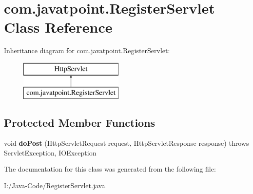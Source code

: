 \hypertarget{classcom_1_1javatpoint_1_1_register_servlet}{}\section{com.\+javatpoint.\+Register\+Servlet Class Reference}
\label{classcom_1_1javatpoint_1_1_register_servlet}
Inheritance diagram for com.\+javatpoint.\+Register\+Servlet\+:\begin{figure}[H]
\begin{center}
\leavevmode
\includegraphics[height=2.000000cm]{classcom_1_1javatpoint_1_1_register_servlet}
\end{center}
\end{figure}
\subsection*{Protected Member Functions}
\begin{DoxyCompactItemize}
\item 
\mbox{\label{classcom_1_1javatpoint_1_1_register_servlet_a4e8906784d758f06675a682e42189b99}} 
void {\bfseries do\+Post} (Http\+Servlet\+Request request, Http\+Servlet\+Response response)  throws Servlet\+Exception, I\+O\+Exception 
\end{DoxyCompactItemize}


The documentation for this class was generated from the following file\+:\begin{DoxyCompactItemize}
\item 
I\+:/\+Java-\/\+Code/Register\+Servlet.\+java\end{DoxyCompactItemize}

